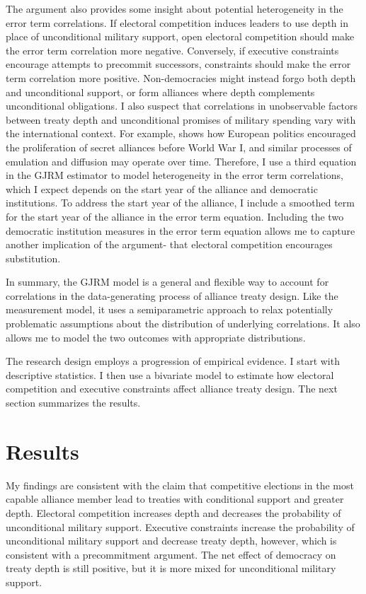 \documentclass[12pt]{article}
\begin{document}
The argument also provides some insight about potential heterogeneity in the error term correlations.  
If electoral competition induces leaders to use depth in place of unconditional military support, open electoral competition should make the error term correlation more negative. 
Conversely, if executive constraints encourage attempts to precommit successors, constraints should make the error term correlation more positive.
Non-democracies might instead forgo both depth and unconditional support, or form alliances where depth complements unconditional obligations. 
I also suspect that correlations in unobservable factors between treaty depth and unconditional promises of military spending vary with the international context.
For example, \citet{Kuo2019} shows how European politics encouraged the proliferation of secret alliances before World War I, and similar processes of emulation and diffusion may operate over time.
Therefore, I use a third equation in the GJRM estimator to model heterogeneity in the error term correlations, which I expect depends on the start year of the alliance and democratic institutions.
To address the start year of the alliance, I include a smoothed term for the start year of the alliance in the error term equation. 
Including the two democratic institution measures in the error term equation allows me to capture another implication of the argument- that electoral competition encourages substitution. 


In summary, the GJRM model is a general and flexible way to account for correlations in the data-generating process of alliance treaty design.
Like the measurement model, it uses a semiparametric approach to relax potentially problematic assumptions about the distribution of underlying correlations. 
It also allows me to model the two outcomes with appropriate distributions. 


The research design employs a progression of empirical evidence. 
I start with descriptive statistics. 
I then use a bivariate model to estimate how electoral competition and executive constraints affect alliance treaty design. 
The next section summarizes the results. 


\section{Results}


My findings are consistent with the claim that competitive elections in the most capable alliance member lead to treaties with conditional support and greater depth. 
Electoral competition increases depth and decreases the probability of unconditional military support.
Executive constraints increase the probability of unconditional military support and decrease treaty depth, however, which is consistent with a precommitment argument.
The net effect of democracy on treaty depth is still positive, but it is more mixed for unconditional military support.  
\end{document}
